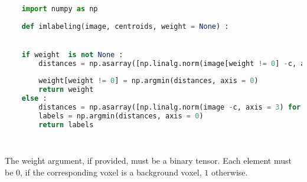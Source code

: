 	\lstset{style=python}
	\begin{lstlisting}[language=python, caption=imlabeling, label=code:imlabeling]
		
	import numpy as np
	
	def imlabeling(image, centroids, weight = None) :


	if weight  is not None :
		distances = np.asarray([np.linalg.norm(image[weight != 0] -c, axis = 1) for c in centroids])
		
		weight[weight != 0] = np.argmin(distances, axis = 0)
		return weight
	else :
		distances = np.asarray([np.linalg.norm(image -c, axis = 3) for c in centroids])
		labels = np.argmin(distances, axis = 0)
		return labels
	
	
	\end{lstlisting}
	

 The weight argument, if provided, must be a binary tensor. Each element must be $0$, if the corresponding voxel is a background voxel,  $1$ otherwise. 

	
	
